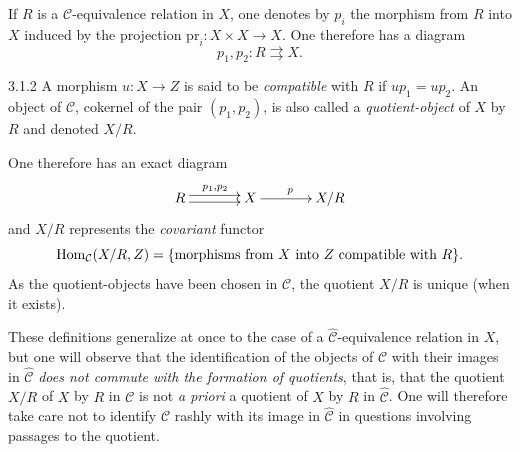 If \(R\) is a \(\mathcal{C}\)-equivalence relation in \(X\), one denotes by
\(p_{i}\) the morphism from \(R\) into \(X\) induced by the projection
\(\mathrm{pr}_{i}\colon X\times X\to X\). One therefore has a diagram
\[
p_{1},p_{2}\colon R\rightrightarrows X.
\]

\begin{definition}{3.1.2}
\label{IV.3.1.2}
A morphism \(u\colon X\to Z\) is said to be \emph{compatible} with \(R\) if
\(up_{1}=up_{2}\). An object of \(\mathcal{C}\), cokernel of the pair
\((p_{1},p_{2})\), is also called a \emph{quotient-object} of \(X\) by \(R\)
and denoted \(X/R\).
\end{definition}

One therefore has an exact diagram
\[
\xymatrix@C=3.6em{
R \ar@<0.55ex>[r]^{p_{1},p_{2}} \ar@<-0.55ex>[r]
  & X \ar[r]^{p}
  & X/R
}
\]
and \(X/R\) represents the \emph{covariant} functor
\[
\operatorname{Hom}_{\mathcal{C}}(X/R,Z)
=\{\text{morphisms from \(X\) into \(Z\) compatible with \(R\)}\}.
\]
As the quotient-objects have been chosen in \(\mathcal{C}\), the quotient
\(X/R\) is unique (when it exists).

These definitions generalize at once to the case of a
\(\widehat{\mathcal{C}}\)-equivalence relation in \(X\), but one will
observe that the identification of the objects of \(\mathcal{C}\) with
their images in \(\widehat{\mathcal{C}}\) \emph{does not commute with the
formation of quotients}, that is, that the quotient \(X/R\) of \(X\) by
\(R\) in \(\mathcal{C}\) is not \emph{a priori} a quotient of \(X\) by \(R\)
in \(\widehat{\mathcal{C}}\). One will therefore take care not to identify
\(\mathcal{C}\) rashly with its image in \(\widehat{\mathcal{C}}\) in
questions involving passages to the
quotient.%
{\renewcommand{\thefootnote}{(11)}}

